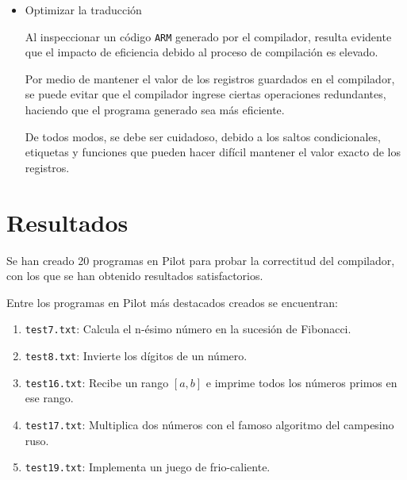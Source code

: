 \documentclass[12pt,spanish]{article}
\begin{document}
\begin{itemize}
\item{Optimizar la traducción}

Al inspeccionar un código \texttt{ARM} generado por el compilador, resulta evidente que el impacto de eficiencia debido al proceso de compilación es elevado.

Por medio de mantener el valor de los registros guardados en el compilador, se puede evitar que el compilador ingrese ciertas operaciones redundantes, haciendo que el programa generado sea más eficiente.

De todos modos, se debe ser cuidadoso, debido a los saltos condicionales, etiquetas y funciones que pueden hacer difícil mantener el valor exacto de los registros.

\end{itemize}

\section{Resultados}
Se han creado 20 programas en Pilot para probar la correctitud del compilador, con los que se han obtenido resultados satisfactorios.

\noindent
Entre los programas en Pilot más destacados creados se encuentran:
\begin{enumerate}
\item{\texttt{test7.txt}: Calcula el n-ésimo número en la sucesión de Fibonacci.}
\item{\texttt{test8.txt}: Invierte los dígitos de un número.}
\item{\texttt{test16.txt}: Recibe un rango $[a, b]$ e imprime todos los números primos en ese rango.}
\item{\texttt{test17.txt}: Multiplica dos números con el famoso algoritmo del campesino ruso.}
\item{\texttt{test19.txt}: Implementa un juego de frio-caliente.}
\end{enumerate}
 
\end{document}
